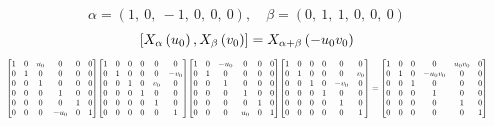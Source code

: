 \documentclass[11pt]{article}
\theoremstyle{definition}
\begin{document}
\[
\alpha = \left( 1, \  0, \  -1, \  0, \  0, \  0\right), \quad \beta = \left( 0, \  1, \  1, \  0, \  0, \  0\right)
\]
\[
\scaletoalign{\textwidth}{\left[ X_{\alpha}\left(u_{0}\right), X_{\beta}\left(v_{0}\right) \right] = X_{\alpha + \beta}\left(- u_{0} v_{0}\right)}
\]
\[
\scaletoalign{\textwidth}{{\left[\begin{matrix}1 & 0 & u_{0} & 0 & 0 & 0\\0 & 1 & 0 & 0 & 0 & 0\\0 & 0 & 1 & 0 & 0 & 0\\0 & 0 & 0 & 1 & 0 & 0\\0 & 0 & 0 & 0 & 1 & 0\\0 & 0 & 0 & - u_{0} & 0 & 1\end{matrix}\right]} {\left[\begin{matrix}1 & 0 & 0 & 0 & 0 & 0\\0 & 1 & 0 & 0 & 0 & - v_{0}\\0 & 0 & 1 & 0 & v_{0} & 0\\0 & 0 & 0 & 1 & 0 & 0\\0 & 0 & 0 & 0 & 1 & 0\\0 & 0 & 0 & 0 & 0 & 1\end{matrix}\right]} {\left[\begin{matrix}1 & 0 & - u_{0} & 0 & 0 & 0\\0 & 1 & 0 & 0 & 0 & 0\\0 & 0 & 1 & 0 & 0 & 0\\0 & 0 & 0 & 1 & 0 & 0\\0 & 0 & 0 & 0 & 1 & 0\\0 & 0 & 0 & u_{0} & 0 & 1\end{matrix}\right]} {\left[\begin{matrix}1 & 0 & 0 & 0 & 0 & 0\\0 & 1 & 0 & 0 & 0 & v_{0}\\0 & 0 & 1 & 0 & - v_{0} & 0\\0 & 0 & 0 & 1 & 0 & 0\\0 & 0 & 0 & 0 & 1 & 0\\0 & 0 & 0 & 0 & 0 & 1\end{matrix}\right]} = {\left[\begin{matrix}1 & 0 & 0 & 0 & u_{0} v_{0} & 0\\0 & 1 & 0 & - u_{0} v_{0} & 0 & 0\\0 & 0 & 1 & 0 & 0 & 0\\0 & 0 & 0 & 1 & 0 & 0\\0 & 0 & 0 & 0 & 1 & 0\\0 & 0 & 0 & 0 & 0 & 1\end{matrix}\right]}}
\]
\end{document}
